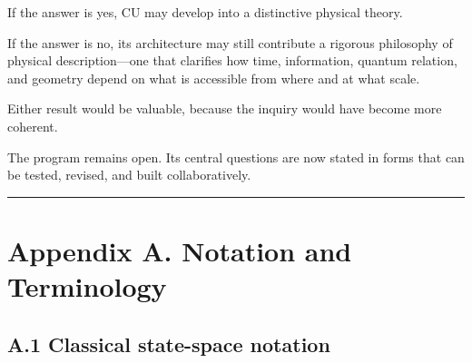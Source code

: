 \documentclass[
  11pt,
]{article}
\begin{document}
If the answer is yes, CU may develop into a distinctive physical theory.

If the answer is no, its architecture may still contribute a rigorous
philosophy of physical description---one that clarifies how time,
information, quantum relation, and geometry depend on what is accessible
from where and at what scale.

Either result would be valuable, because the inquiry would have become
more coherent.

The program remains open. Its central questions are now stated in forms
that can be tested, revised, and built collaboratively.

\begin{center}\rule{0.5\linewidth}{0.5pt}\end{center}

\section{Appendix A. Notation and
Terminology}\label{appendix-a.-notation-and-terminology}

\subsection{A.1 Classical state-space
notation}\label{a.1-classical-state-space-notation}
\end{document}
